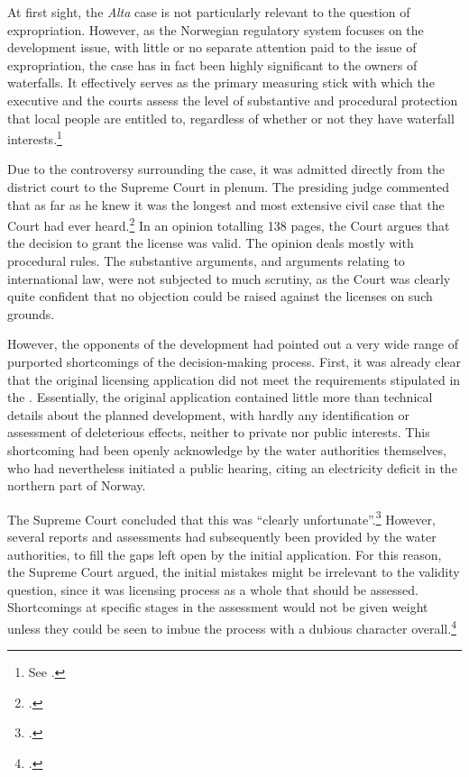 At first sight, the {\it Alta} case is not particularly relevant to the question of expropriation. However, as the Norwegian regulatory system focuses on the development issue, with little or no separate attention paid to the issue of expropriation, the case has in fact been highly significant to the owners of waterfalls. It effectively serves as the primary measuring stick with which the executive and the courts assess the level of substantive and procedural protection that local people are entitled to, regardless of whether or not they have waterfall interests.\footnote{See \cite{sauda09,jorpeland11}.}

Due to the controversy surrounding the case, it was admitted directly from the district court to the Supreme Court in plenum. The presiding judge commented that as far as he knew it was the longest and most extensive civil case that the Court had ever heard.\footcite[254]{alta82} In an opinion totalling 138 pages, the Court argues that the decision to grant the license was valid. The opinion deals mostly with procedural rules. The substantive arguments, and arguments relating to international law, were not subjected to much scrutiny, as the Court was clearly quite confident that no objection could be raised against the licenses on such grounds.

However, the opponents of the development had pointed out a very wide range of purported shortcomings of the decision-making process. First, it was already clear that the original licensing application did not meet the requirements stipulated in the \cite[5]{wra17}. Essentially, the original application contained little more than technical details about the planned development, with hardly any identification or assessment of deleterious effects, neither to private nor public interests. This shortcoming had been openly acknowledge by the water authorities themselves, who had nevertheless initiated a public hearing, citing an electricity deficit in the northern part of Norway. 

The Supreme Court concluded that this was ``clearly unfortunate''.\footcite[265]{alta82} However, several reports and assessments had subsequently been provided by the water authorities, to fill the gaps left open by the initial application. For this reason, the Supreme Court argued, the initial mistakes might be irrelevant to the validity question, since it was licensing process as a whole that should be assessed. Shortcomings at specific stages in the assessment would not be given weight unless they could be seen to imbue the process with a dubious character overall.\footcite[265]{alta82}

